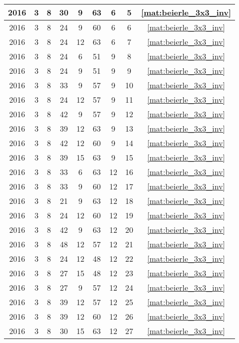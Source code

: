 \begin{longtable}{|c|c|c|c|c|c|c|c|c|}
2016 & 3 & 8 & 30 & 9 & 63 & 6 & 5 & \eqref{mat:beierle_3x3_inv} \\ \hline 
2016 & 3 & 8 & 24 & 9 & 60 & 6 & 6 & \eqref{mat:beierle_3x3_inv} \\ \hline 
2016 & 3 & 8 & 24 & 12 & 63 & 6 & 7 & \eqref{mat:beierle_3x3_inv} \\ \hline 
2016 & 3 & 8 & 24 & 6 & 51 & 9 & 8 & \eqref{mat:beierle_3x3_inv} \\ \hline 
2016 & 3 & 8 & 24 & 9 & 51 & 9 & 9 & \eqref{mat:beierle_3x3_inv} \\ \hline 
2016 & 3 & 8 & 33 & 9 & 57 & 9 & 10 & \eqref{mat:beierle_3x3_inv} \\ \hline 
2016 & 3 & 8 & 24 & 12 & 57 & 9 & 11 & \eqref{mat:beierle_3x3_inv} \\ \hline 
2016 & 3 & 8 & 42 & 9 & 57 & 9 & 12 & \eqref{mat:beierle_3x3_inv} \\ \hline 
2016 & 3 & 8 & 39 & 12 & 63 & 9 & 13 & \eqref{mat:beierle_3x3_inv} \\ \hline 
2016 & 3 & 8 & 42 & 12 & 60 & 9 & 14 & \eqref{mat:beierle_3x3_inv} \\ \hline 
2016 & 3 & 8 & 39 & 15 & 63 & 9 & 15 & \eqref{mat:beierle_3x3_inv} \\ \hline 
2016 & 3 & 8 & 33 & 6 & 63 & 12 & 16 & \eqref{mat:beierle_3x3_inv} \\ \hline 
2016 & 3 & 8 & 33 & 9 & 60 & 12 & 17 & \eqref{mat:beierle_3x3_inv} \\ \hline 
2016 & 3 & 8 & 21 & 9 & 63 & 12 & 18 & \eqref{mat:beierle_3x3_inv} \\ \hline 
2016 & 3 & 8 & 24 & 12 & 60 & 12 & 19 & \eqref{mat:beierle_3x3_inv} \\ \hline 
2016 & 3 & 8 & 42 & 9 & 63 & 12 & 20 & \eqref{mat:beierle_3x3_inv} \\ \hline 
2016 & 3 & 8 & 48 & 12 & 57 & 12 & 21 & \eqref{mat:beierle_3x3_inv} \\ \hline 
2016 & 3 & 8 & 24 & 12 & 48 & 12 & 22 & \eqref{mat:beierle_3x3_inv} \\ \hline 
2016 & 3 & 8 & 27 & 15 & 48 & 12 & 23 & \eqref{mat:beierle_3x3_inv} \\ \hline 
2016 & 3 & 8 & 27 & 9 & 57 & 12 & 24 & \eqref{mat:beierle_3x3_inv} \\ \hline 
2016 & 3 & 8 & 39 & 12 & 57 & 12 & 25 & \eqref{mat:beierle_3x3_inv} \\ \hline 
2016 & 3 & 8 & 39 & 12 & 60 & 12 & 26 & \eqref{mat:beierle_3x3_inv} \\ \hline 
2016 & 3 & 8 & 30 & 15 & 63 & 12 & 27 & \eqref{mat:beierle_3x3_inv} \\ \hline 

\end{longtable}
